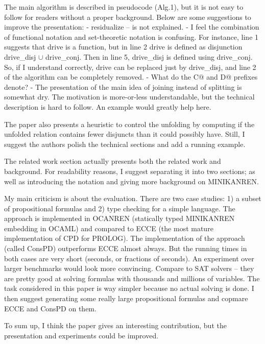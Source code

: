 The main algorithm is described in pseudocode (Alg.1), but it is not easy to follow for readers without a proper background. Below are some suggestions to improve the presentation:
 - residualize -- is not explained.
 - I feel the combination of functional notation and set-theoretic notation is confusing. For instance, line 1 suggests that drive is a function, but in line 2 drive is defined as disjunction drive_disj $\cup$ drive_conj. Then in line 5, drive_disj is defined using drive_conj. So, if I understand correctly, drive can be replaced just by drive_disj, and line 2 of the algorithm can be completely removed.
 - What do the C@ and D@ prefixes denote?
 - The presentation of the main idea of joining instead of splitting is somewhat dry. The motivation is more-or-less understandable, but the technical description is hard to follow. An example would greatly help here.

The paper also presents a heuristic to control the unfolding by computing if the unfolded relation contains fewer disjuncts than it could possibly have. Still, I suggest the authors polish the technical sections and add a running example.

The related work section actually presents both the related work and background. For readability reasons, I suggest separating it into two sections; as well as introducing the notation and giving more background on MINIKANREN.

My main criticism is about the evaluation. There are two case studies: 1) a subset of propositional formulas and 2) type checking for a simple language. The approach is implemented in OCANREN (statically typed MINIKANREN embedding in OCAML) and compared to ECCE (the most mature implementation of CPD for PROLOG). The implementation of the approach (called ConsPD) outperforms ECCE almost always. But the running times in both cases are very short (seconds, or fractions of seconds). An experiment over larger benchmarks would look more convincing. Compare to SAT solvers -- they are pretty good at solving formulas with thousands and millions of variables. The task considered in this paper is way simpler because no actual solving is done. I then suggest generating some really large propositional formulas and copmare ECCE and ConsPD on them.

To sum up, I think the paper gives an interesting contribution, but the presentation and experiments could be improved.
